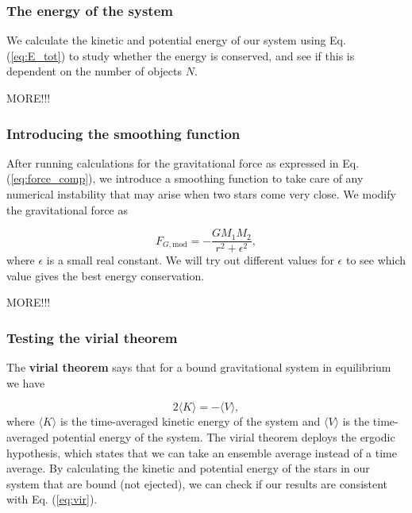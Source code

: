 \documentclass{article}
\begin{document}
\begin{multicols}{2}
\subsubsection{The energy of the system}

We calculate the kinetic and potential energy of our system using Eq. (\ref{eq:E_tot}) to study whether the energy is conserved, and see if this is dependent on the number of objects $N$.

MORE!!!



\subsubsection{Introducing the smoothing function}

After running calculations for the gravitational force as expressed in Eq. (\ref{eq:force_comp}), we introduce a smoothing function to take care of any numerical instability that may arise when two stars come very close. We modify the gravitational force as

\begin{equation}\label{eq:force_mod}
	F_{G,\mathrm{mod}} = - \frac{G M_1 M_2}{r^2 + \epsilon^2},
\end{equation}
where $\epsilon$ is a small real constant. We will try out different values for $\epsilon$ to see which value gives the best energy conservation.

MORE!!!




\subsubsection{Testing the virial theorem}

The \textbf{virial theorem} says that for a bound gravitational system in equilibrium we have

\begin{equation}\label{eq:vir}
	2 \langle K \rangle = - \langle V \rangle,
\end{equation}
where $\langle K \rangle$ is the time-averaged kinetic energy of the system and $\langle V \rangle$ is the time-averaged potential energy of the system. The virial theorem deploys the ergodic hypothesis, which states that we can take an ensemble average instead of a time average. By calculating the kinetic and potential energy of the stars in our system that are bound (not ejected), we can check if our results are consistent with Eq. (\ref{eq:vir}).


\end{multicols}
\end{document}
